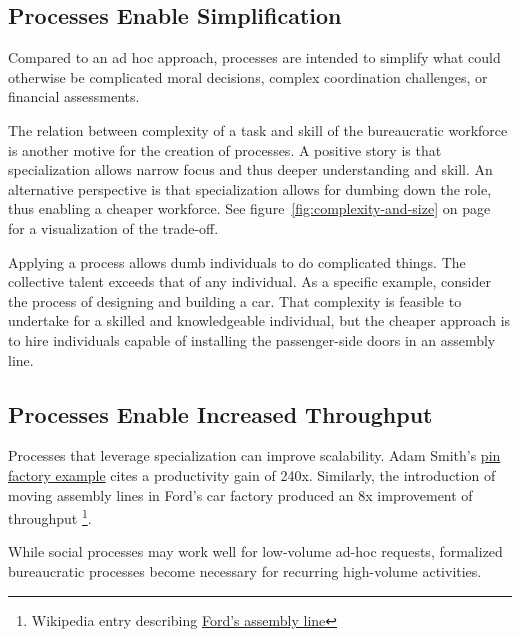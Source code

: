 \subsection*{Processes Enable Simplification}
Compared to an ad hoc approach, processes are intended to simplify what could otherwise be complicated moral decisions, complex coordination challenges, or financial assessments. %


The relation between complexity of a task and skill of the bureaucratic workforce is another motive for the creation of processes.
A positive story is that specialization allows narrow focus and thus deeper understanding and skill. An alternative perspective is that specialization allows for dumbing down the role, thus enabling a cheaper workforce. See figure~\ref{fig:complexity-and-size} on page~\pageref{fig:complexity-and-size} for a visualization of the trade-off.

Applying a process allows dumb individuals to do complicated things. The collective talent exceeds that of any individual.  As a specific example, consider the process of designing and building a car. That complexity is feasible to undertake for a skilled and knowledgeable individual, but the cheaper approach is to hire individuals capable of installing the passenger-side doors in an assembly line.


\subsection*{Processes Enable Increased Throughput}

Processes that leverage specialization can improve scalability. Adam Smith's \href{https://en.wikipedia.org/wiki/Business_process#Adam_Smith}{pin factory example} cites a productivity gain of 240x.
Similarly, the introduction of moving assembly lines in Ford's car factory produced an 8x improvement of throughput \footnote{Wikipedia entry describing \href{https://en.wikipedia.org/wiki/Assembly_line\%2320th_century}{Ford's assembly line}
}. 


While social processes may work well for low-volume ad-hoc requests, formalized bureaucratic processes become necessary for recurring high-volume activities.

